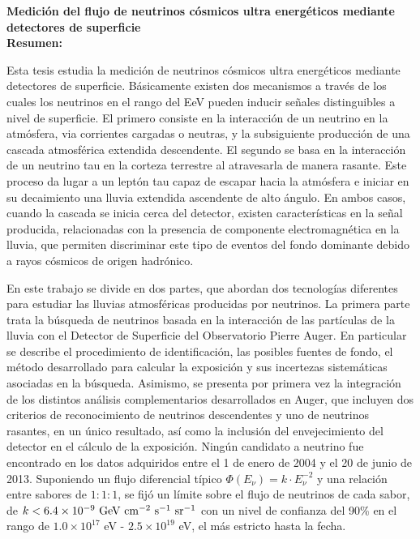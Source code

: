 \begin{titlepage}

$\,$\\[2.5cm]
\textbf{\Large  Medición del flujo de neutrinos cósmicos ultra energéticos mediante detectores de superficie}\\[2.5cm]

\noindent
\textbf{Resumen: }

Esta tesis estudia la medici\'on de neutrinos cósmicos ultra energéticos mediante detectores de superficie.
B\'asicamente existen dos mecanismos a trav\'es de los cuales los neutrinos en el rango del EeV pueden inducir señales distinguibles a nivel de superficie.
El primero consiste en la interacción de un neutrino en la atmósfera, via corrientes cargadas o neutras, y la subsiguiente producci\'on de una cascada atmosférica extendida descendente.
El segundo se basa en la interacción de un neutrino tau en la corteza terrestre al atravesarla de manera rasante.
Este proceso da lugar a un leptón tau capaz de escapar hacia la atmósfera e iniciar en su decaimiento una lluvia extendida ascendente de alto \'angulo.
En ambos casos, cuando la cascada se inicia cerca del detector, existen características en la señal producida, relacionadas con la presencia de componente electromagnética en la lluvia, que permiten discriminar este tipo de eventos del fondo dominante debido a rayos cósmicos de origen hadrónico.

En este trabajo se divide en dos partes, que abordan dos tecnolog\'ias diferentes para estudiar las lluvias atmosf\'ericas producidas por neutrinos.
La primera parte trata la b\'usqueda de neutrinos basada en la interacci\'on de las part\'iculas de la lluvia con el Detector de Superficie del Observatorio Pierre Auger.
En particular se describe el procedimiento de identificaci\'on, las posibles fuentes de fondo, el método desarrollado para calcular la exposición y sus incertezas sistemáticas asociadas en la b\'usqueda.
Asimismo, se presenta por primera vez la integración de los distintos análisis complementarios desarrollados en Auger, que incluyen dos criterios de reconocimiento de neutrinos descendentes y uno de neutrinos rasantes, en un único resultado, as\'i como la inclusión del envejecimiento del detector en el cálculo de la exposición.
Ningún candidato a neutrino fue encontrado en los datos adquiridos entre el 1 de enero de 2004 y el 20 de junio de 2013. Suponiendo un flujo diferencial típico $\Phi(E_\nu) = k\cdot E_\nu^{-2}$ y una relación entre sabores de $1:1:1$, se fijó un límite sobre el flujo de neutrinos de cada sabor, de $k < 6.4 \times 10^{-9}~{\rm GeV~cm^{-2}~s^{-1}~sr^{-1}}$ con un nivel de confianza del 90\% en el rango de ${1.0 \times 10^{17}}$ {eV} - ${2.5 \times 10^{19}}$ {eV}, el m\'as estricto hasta la fecha.


\end{titlepage}
